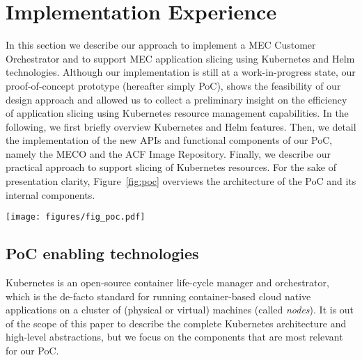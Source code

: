 \section{Implementation Experience}
\label{sec:implementation}
\noindent
%
In this section we describe our approach to implement a MEC Customer Orchestrator and to support MEC application slicing using Kubernetes and Helm technologies. Although our implementation is still at a work-in-progress state, our proof-of-concept prototype (hereafter simply PoC), shows the feasibility of our design approach and allowed us to collect a preliminary insight on the efficiency of application slicing using Kubernetes resource management capabilities. In the following, we first briefly overview Kubernetes and Helm features. Then, we detail the implementation of the new APIs and functional components  of our PoC,  namely the MECO and the ACF Image Repository. Finally, we describe our practical approach to support slicing of Kubernetes resources. For the sake of presentation clarity, Figure~\ref{fig:poc} overviews the architecture of the PoC and its internal components.
%
\begin{figure*}[ht]
    \centering
    \texttt{[image: figures/fig\_poc.pdf]}
   \caption{PoC architecture and internal components.}
    \label{fig:poc}
    \vspace{-0.2cm}
\end{figure*}
%
\subsection{PoC enabling technologies}
\label{sec:poc_tech}
\noindent
%
Kubernetes is an open-source container life-cycle manager and orchestrator, which is the de-facto standard for running container-based cloud native applications on a cluster of (physical or virtual) machines (called \textit{nodes}). It is out of the scope of this paper to describe the complete Kubernetes architecture and high-level abstractions, but we focus on the components that are most relevant for our PoC. 

